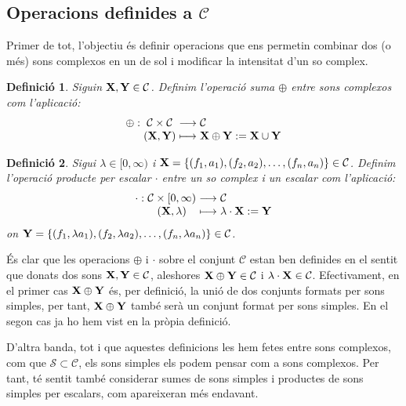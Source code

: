\documentclass{article}
\theoremstyle{math}
\newtheorem{definition}{Definició}[section]
\theoremstyle{TheoremNum}
\newcommand{\0}{\ensuremath{\vb{0}}}
\newcommand{\X}{\ensuremath{\vb{X}}}
\newcommand{\Y}{\ensuremath{\vb{Y}}}
\begin{document}
\subsection{Operacions definides a \texorpdfstring{$\mathcal{C}$}{C}}
Primer de tot, l'objectiu és definir operacions que ens permetin combinar dos (o més) sons complexos en un de sol i modificar la intensitat d'un so complex.
\begin{definition}
  Siguin $\X,\Y\in\mathcal{C}$. Definim l'operació \textit{suma $\oplus$} entre sons complexos com l'aplicació:
  \begin{equation*}
    \begin{array}{r@{\hspace{0.5\tabcolsep}}c@{\hspace{0.5\tabcolsep}}c@{\hspace{0.5\tabcolsep}}l}
      \oplus: & \mathcal{C}\times\mathcal{C} & \longrightarrow & \mathcal{C}           \\
              & (\X,\Y)                      & \longmapsto     & \X\oplus \Y:=\X\cup\Y
    \end{array}
  \end{equation*}
\end{definition}
\begin{definition}\label{prod_per_escalar}
  Sigui $\lambda\in[0,\infty)$ i $\X=\{(f_1,a_1),(f_2,a_2),\ldots,(f_n,a_n)\}\in\mathcal{C}$. Definim l'operació \textit{producte per escalar $\cdot$} entre un so complex i un escalar com l'aplicació:
  \begin{equation*}
    \begin{array}{r@{\hspace{0.5\tabcolsep}}c@{\hspace{0.5\tabcolsep}}c@{\hspace{0.5\tabcolsep}}l}
      \cdot: & \mathcal{C}\times[0,\infty) & \longrightarrow & \mathcal{C}         \\
             & (\X,\lambda)                & \longmapsto     & \lambda\cdot \X:=\Y
    \end{array}
  \end{equation*}
  on $\Y=\{(f_1,\lambda a_1),(f_2,\lambda a_2),\ldots,(f_n,\lambda a_n)\}\in\mathcal{C}$.
\end{definition}
És clar que les operacions $\oplus$ i $\cdot$ sobre el conjunt $\mathcal{C}$ estan ben definides en el sentit que donats dos sons $\X,\Y\in\mathcal{C}$, aleshores $\X\oplus\Y\in\mathcal{C}$ i $\lambda\cdot\X\in\mathcal{C}$. Efectivament, en el primer cas $\X\oplus\Y$ és, per definició, la unió de dos conjunts formats per sons simples, per tant, $\X\oplus\Y$ també serà un conjunt format per sons simples. En el segon cas ja ho hem vist en la pròpia definició.\par
D'altra banda, tot i que aquestes definicions les hem fetes entre sons complexos, com que $\mathcal{S}\subset\mathcal{C}$, els sons simples els podem pensar com a sons complexos. Per tant, té sentit també considerar sumes de sons simples i productes de sons simples per escalars, com apareixeran més endavant.
\end{document}
